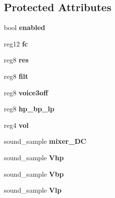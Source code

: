 \subsection*{Protected Attributes}
\begin{DoxyCompactItemize}
\item 
\hypertarget{classFilter_ac302af9c43536b908fe375f29536f1ae}{bool {\bfseries enabled}}\label{classFilter_ac302af9c43536b908fe375f29536f1ae}

\item 
\hypertarget{classFilter_ac1fcb28efe5df0697f4b60059db202ab}{reg12 {\bfseries fc}}\label{classFilter_ac1fcb28efe5df0697f4b60059db202ab}

\item 
\hypertarget{classFilter_ad3e139ed5b2a43436f144b82b9fc1427}{reg8 {\bfseries res}}\label{classFilter_ad3e139ed5b2a43436f144b82b9fc1427}

\item 
\hypertarget{classFilter_a2dc4070ef02930fdb1b4e1b188b08777}{reg8 {\bfseries filt}}\label{classFilter_a2dc4070ef02930fdb1b4e1b188b08777}

\item 
\hypertarget{classFilter_a6e528a158d5540cbaaab7a58a14315e2}{reg8 {\bfseries voice3off}}\label{classFilter_a6e528a158d5540cbaaab7a58a14315e2}

\item 
\hypertarget{classFilter_a14b6a5feb645ffa5af4d54808c107188}{reg8 {\bfseries hp\-\_\-bp\-\_\-lp}}\label{classFilter_a14b6a5feb645ffa5af4d54808c107188}

\item 
\hypertarget{classFilter_a7d41a2ee76135d6b9cb5976704a20e8f}{reg4 {\bfseries vol}}\label{classFilter_a7d41a2ee76135d6b9cb5976704a20e8f}

\item 
\hypertarget{classFilter_ae4beac687c9a1710e593f05202b4a5fa}{sound\-\_\-sample {\bfseries mixer\-\_\-\-D\-C}}\label{classFilter_ae4beac687c9a1710e593f05202b4a5fa}

\item 
\hypertarget{classFilter_ac669454631d798c739308156e05352b0}{sound\-\_\-sample {\bfseries Vhp}}\label{classFilter_ac669454631d798c739308156e05352b0}

\item 
\hypertarget{classFilter_a11af103f0f8969ccd17259ea61d390f6}{sound\-\_\-sample {\bfseries Vbp}}\label{classFilter_a11af103f0f8969ccd17259ea61d390f6}

\item 
\hypertarget{classFilter_aea8f68359fa8d881b4c2472e824fe8a9}{sound\-\_\-sample {\bfseries Vlp}}\label{classFilter_aea8f68359fa8d881b4c2472e824fe8a9}


\end{DoxyCompactItemize}
